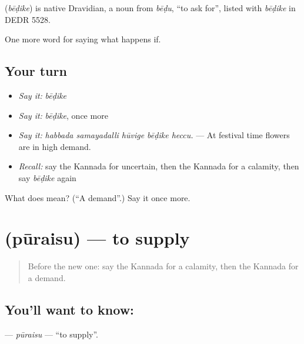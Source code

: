 \begin{cousinweb}
\textbf{} (\emph{bēḍike}) is native Dravidian, a noun from \emph{bēḍu}, \textquotedblleft{}to ask for\textquotedblright{}, listed with \emph{bēḍike} in DEDR 5528.
\end{cousinweb}

\begin{grammarlens}[title={What you've built}]
One more word for saying what happens if.
\end{grammarlens}

\subsection*{Your turn}
\begin{itemize}
\raggedright
  \item \emph{Say it:} \emph{bēḍike}
  \item \emph{Say it:} \emph{bēḍike}, once more
  \item \emph{Say it:} \emph{habbada samayadalli hūvige bēḍike heccu.} — At festival time flowers are in high demand.
  \item \emph{Recall:} say the Kannada for uncertain, then the Kannada for a calamity, then say \emph{bēḍike} again
\end{itemize}

\begin{tcolorbox}[breakable,colback=teal!4,colframe=teal!35!black,title={Before you move on}]
What does  mean? (\textquotedblleft{}A demand\textquotedblright{}.) Say it once more.
\end{tcolorbox}
\section[\texorpdfstring{\kn{ಪೂರೈಸು} (pūraisu)}{ಪೂರೈಸು (pūraisu)}]{ (pūraisu) — to supply}

\label{lesson:KA-C421-puraisu}



\begin{quote}
Before the new one: say the Kannada for a calamity, then the Kannada for a demand.
\end{quote}

\subsection*{You'll want to know: }
\textbf{} — \emph{pūraisu} — \textquotedblleft{}to supply\textquotedblright{}.

